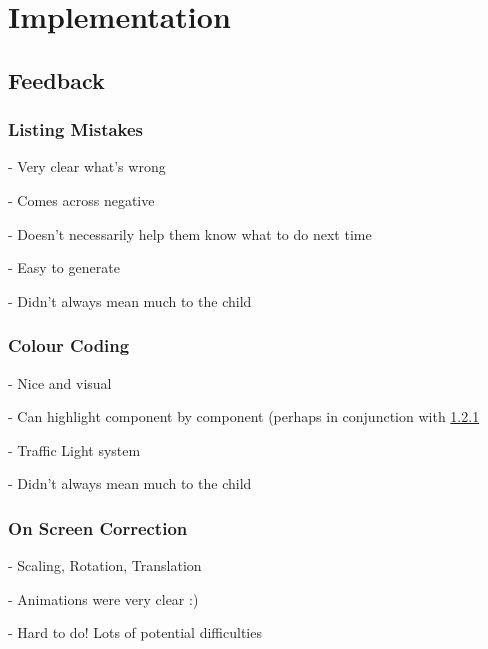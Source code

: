 \chapter{Implementation}


\section{}



\section{Feedback}

\subsection{Listing Mistakes}
\label{sec:feedback-listing}

- Very clear what's wrong

- Comes across negative

- Doesn't necessarily help them know what to do next time

- Easy to generate

- Didn't always mean much to the child

\subsection{Colour Coding}

- Nice and visual

- Can highlight component by component (perhaps in conjunction with \cref{sec:feedback-listing}

- Traffic Light system

- Didn't always mean much to the child

\subsection{On Screen Correction}

- Scaling, Rotation, Translation

- Animations were very clear :)

- Hard to do! Lots of potential difficulties

